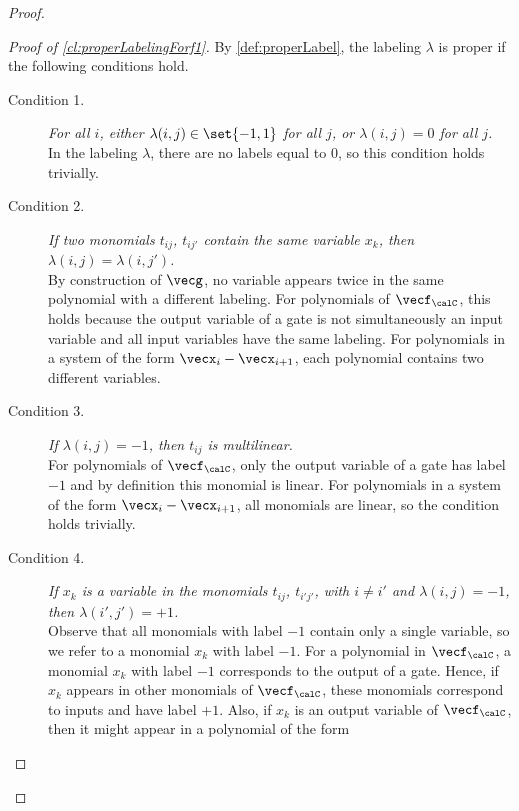 \begin{proof}
\begin{proof}[Proof of \autoref{cl:properLabelingForf1}]
        By \autoref{def:properLabel}, the labeling $\lambda$ is proper if the following conditions hold.
      \begin{description}
        \item[Condition 1.] \emph{For all $i$, either $\lambda(i, j) \in \set{-1, 1}$ for all $j$, or $\lambda(i, j) = 0$ for all $j$.} \\
              In the labeling $\lambda$, there are no labels equal to
              $0$, so this condition holds trivially.
        \item[Condition 2.] \emph{If two monomials $t_{i j}$, $t_{i j'}$ contain the same
              variable $x_k$, then $\lambda(i, j) = \lambda(i, j')$.}\\
              By construction of $\vecg$, no variable appears twice in the same
              polynomial with a different labeling. For polynomials of
              $\vecf_{\calC}$, this holds because the output variable of a gate is
              not simultaneously an input variable and all
              input variables have the same labeling. For polynomials in a system of
              the form $\vecx_i - \vecx_{i+1}$, each polynomial contains two different
              variables.
        \item[Condition 3.] \emph{If $\lambda(i, j) = -1$, then $t_{i j}$ is multilinear.} \\
              For polynomials of $\vecf_{\calC}$, only the output variable of a
              gate has label $-1$ and by definition this monomial is linear. For
              polynomials in a system of the form $\vecx_i - \vecx_{i+1}$, all monomials
              are linear, so the condition holds trivially.
        \item[Condition 4.] \emph{If $x_k$ is a variable in the monomials $t_{i j}$,
              $t_{i' j'}$,
              with $i \neq i'$ and $\lambda(i, j) = -1$, then $\lambda(i', j') = +1$.} \\
              Observe that all monomials with label $-1$ contain only a single
              variable, so we refer to a monomial $x_k$ with label $-1$.
              For a polynomial in $\vecf_{\calC}$, a monomial $x_k$ with label $-1$
              corresponds to the output of a gate. Hence, if $x_k$ appears in other
              monomials of $\vecf_{\calC}$, these monomials correspond to inputs
              and have label $+1$. Also, if $x_k$ is an output variable of
              $\vecf_{\calC}$, then it might appear in a polynomial of the form

\end{description}
\end{proof}
\end{proof}
